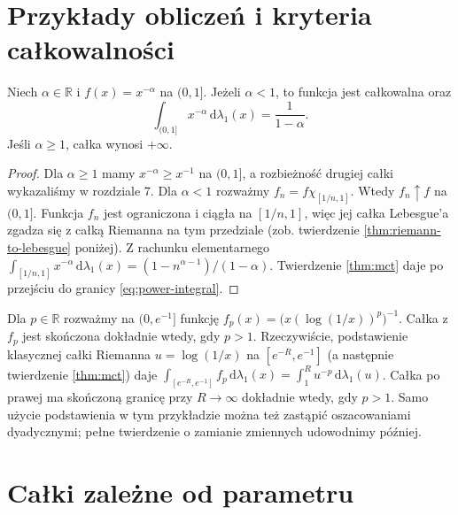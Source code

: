 \section{Przykłady obliczeń i kryteria całkowalności}

\begin{przyklad}
\label{ex:power-integral}
Niech $\alpha\in\mathbb R$ i
$f(x)=x^{-\alpha}$ na $(0,1]$.
Jeżeli $\alpha<1$, to funkcja jest całkowalna oraz
\begin{equation}\label{eq:power-integral}
\int_{(0,1]}x^{-\alpha}\,\mathrm d\lambda_1(x)
=\frac1{1-\alpha}.
\end{equation}
Jeśli $\alpha\ge1$, całka wynosi $+\infty$.
\end{przyklad}
\begin{proof}
Dla $\alpha\ge1$ mamy $x^{-\alpha}\ge x^{-1}$
na $(0,1]$, a rozbieżność drugiej całki
wykazaliśmy w rozdziale 7. Dla $\alpha<1$
rozważmy $f_n=f\chi_{[1/n,1]}$.
Wtedy $f_n\uparrow f$ na $(0,1]$.
Funkcja $f_n$ jest ograniczona i ciągła na
$[1/n,1]$, więc jej całka Lebesgue'a zgadza się
z całką Riemanna na tym przedziale (zob.
twierdzenie \ref{thm:riemann-to-lebesgue} poniżej).
Z rachunku elementarnego
$\int_{[1/n,1]}x^{-\alpha}\,\mathrm d\lambda_1(x)
=(1-n^{\alpha-1})/(1-\alpha)$.
Twierdzenie \ref{thm:mct} daje po przejściu do
granicy \eqref{eq:power-integral}.
\end{proof}

\begin{przyklad}
Dla $p\in\mathbb R$ rozważmy na $(0,e^{-1}]$
funkcję $f_p(x)=\bigl(x(\log(1/x))^p\bigr)^{-1}$.
Całka z $f_p$ jest skończona dokładnie wtedy, gdy
$p>1$. Rzeczywiście, podstawienie klasycznej
całki Riemanna $u=\log(1/x)$ na
$[e^{-R},e^{-1}]$ (a następnie twierdzenie
\ref{thm:mct}) daje
$\int_{[e^{-R},e^{-1}]}f_p\,\mathrm d\lambda_1(x)
=\int_1^R u^{-p}\,\mathrm d\lambda_1(u)$.
Całka po prawej ma skończoną granicę przy
$R\to\infty$ dokładnie wtedy, gdy $p>1$.
Samo użycie podstawienia w tym przykładzie
można też zastąpić oszacowaniami dyadycznymi;
pełne twierdzenie o zamianie zmiennych
udowodnimy później.
\end{przyklad}

\section{Całki zależne od parametru}

